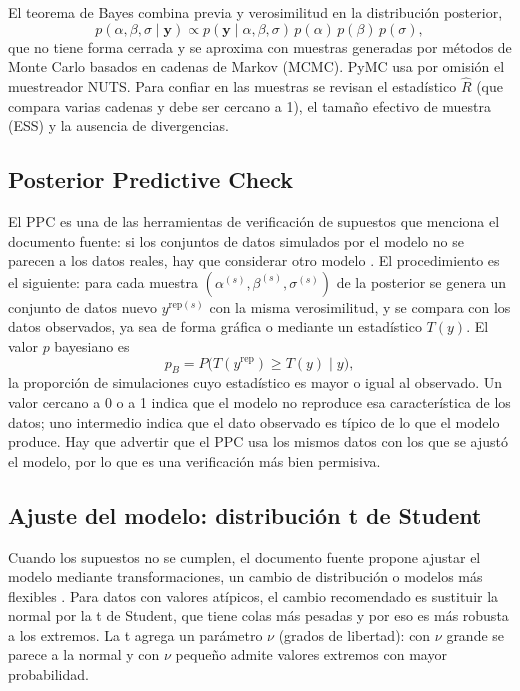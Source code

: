 \documentclass[11pt,letterpaper]{article}
\begin{document}
El teorema de Bayes combina previa y verosimilitud en la distribución posterior,
\begin{equation}
p(\alpha, \beta, \sigma \mid \mathbf{y}) \propto p(\mathbf{y} \mid \alpha, \beta, \sigma)\, p(\alpha)\, p(\beta)\, p(\sigma),
\end{equation}
que no tiene forma cerrada y se aproxima con muestras generadas por métodos de Monte Carlo basados en cadenas de Markov (MCMC). PyMC usa por omisión el muestreador NUTS. Para confiar en las muestras se revisan el estadístico $\hat{R}$ (que compara varias cadenas y debe ser cercano a 1), el tamaño efectivo de muestra (ESS) y la ausencia de divergencias.

\subsection{Posterior Predictive Check}

El PPC es una de las herramientas de verificación de supuestos que menciona el documento fuente: si los conjuntos de datos simulados por el modelo no se parecen a los datos reales, hay que considerar otro modelo \parencite{tecnm2026_documento_fuente}. El procedimiento es el siguiente: para cada muestra $(\alpha^{(s)}, \beta^{(s)}, \sigma^{(s)})$ de la posterior se genera un conjunto de datos nuevo $y^{\mathrm{rep}(s)}$ con la misma verosimilitud, y se compara con los datos observados, ya sea de forma gráfica o mediante un estadístico $T(y)$. El valor $p$ bayesiano es
\begin{equation}
p_B = P\big(T(y^{\mathrm{rep}}) \ge T(y) \mid y\big),
\end{equation}
la proporción de simulaciones cuyo estadístico es mayor o igual al observado. Un valor cercano a 0 o a 1 indica que el modelo no reproduce esa característica de los datos; uno intermedio indica que el dato observado es típico de lo que el modelo produce. Hay que advertir que el PPC usa los mismos datos con los que se ajustó el modelo, por lo que es una verificación más bien permisiva.

\subsection{Ajuste del modelo: distribución t de Student}

Cuando los supuestos no se cumplen, el documento fuente propone ajustar el modelo mediante transformaciones, un cambio de distribución o modelos más flexibles \parencite{tecnm2026_documento_fuente}. Para datos con valores atípicos, el cambio recomendado es sustituir la normal por la t de Student, que tiene colas más pesadas y por eso es más robusta a los extremos. La t agrega un parámetro $\nu$ (grados de libertad): con $\nu$ grande se parece a la normal y con $\nu$ pequeño admite valores extremos con mayor probabilidad.
\end{document}
